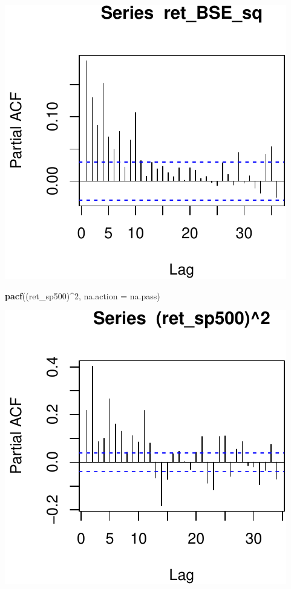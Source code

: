 \documentclass[11pt,]{article}
\newenvironment{Shaded}{\begin{snugshade}}{\end{snugshade}}
\newcommand{\KeywordTok}[1]{\textcolor[rgb]{0.13,0.29,0.53}{\textbf{#1}}}
\newcommand{\DataTypeTok}[1]{\textcolor[rgb]{0.13,0.29,0.53}{#1}}
\newcommand{\DecValTok}[1]{\textcolor[rgb]{0.00,0.00,0.81}{#1}}
\newcommand{\OperatorTok}[1]{\textcolor[rgb]{0.81,0.36,0.00}{\textbf{#1}}}
\newcommand{\NormalTok}[1]{#1}
\begin{document}
\begin{center}\includegraphics{FMC_T4_PhD_ARMA_GARCH_files/figure-latex/ARCH_order-1} \end{center}

\begin{Shaded}
\begin{Highlighting}[]
\KeywordTok{pacf}\NormalTok{((ret_sp500)}\OperatorTok{^}\DecValTok{2}\NormalTok{, }\DataTypeTok{na.action =}\NormalTok{ na.pass)}
\end{Highlighting}
\end{Shaded}

\begin{center}\includegraphics{FMC_T4_PhD_ARMA_GARCH_files/figure-latex/ARCH_order-2} \end{center}
\end{document}
